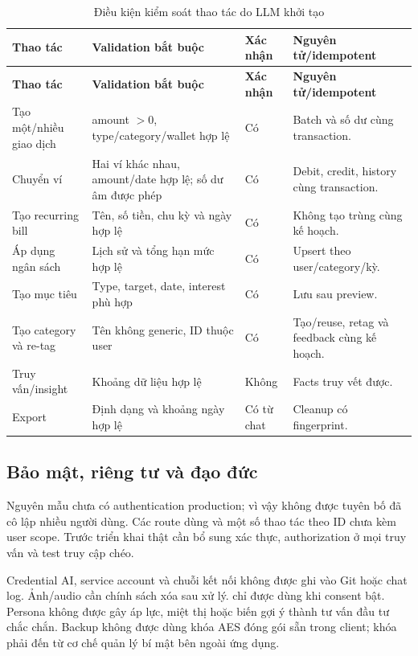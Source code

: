 \begin{longtable}{@{}L{3.0cm}L{5.0cm}L{1.5cm}L{3.2cm}@{}}
  \caption{Điều kiện kiểm soát thao tác do LLM khởi tạo}\label{tab:llm-actions}\\
  \toprule
  \textbf{Thao tác} & \textbf{Validation bắt buộc} & \textbf{Xác nhận} & \textbf{Nguyên tử/idempotent} \\
  \midrule
  \endfirsthead
  \toprule
  \textbf{Thao tác} & \textbf{Validation bắt buộc} & \textbf{Xác nhận} & \textbf{Nguyên tử/idempotent} \\
  \midrule
  \endhead
  Tạo một/nhiều giao dịch & amount $>0$, type/category/wallet hợp lệ & Có & Batch và số dư cùng transaction. \\
  Chuyển ví & Hai ví khác nhau, amount/date hợp lệ; số dư âm được phép & Có & Debit, credit, history cùng transaction. \\
  Tạo recurring bill & Tên, số tiền, chu kỳ và ngày hợp lệ & Có & Không tạo trùng cùng kế hoạch. \\
  Áp dụng ngân sách & Lịch sử và tổng hạn mức hợp lệ & Có & Upsert theo user/category/kỳ. \\
  Tạo mục tiêu & Type, target, date, interest phù hợp & Có & Lưu sau preview. \\
  Tạo category và re-tag & Tên không generic, ID thuộc user & Có & Tạo/reuse, retag và feedback cùng kế hoạch. \\
  Truy vấn/insight & Khoảng dữ liệu hợp lệ & Không & Facts truy vết được. \\
  Export & Định dạng và khoảng ngày hợp lệ & Có từ chat & Cleanup có fingerprint. \\
  \bottomrule
\end{longtable}

\subsection{Bảo mật, riêng tư và đạo đức}

Nguyên mẫu chưa có authentication production; vì vậy không được tuyên bố đã cô lập nhiều người dùng. Các route dùng  và một số thao tác theo ID chưa kèm user scope. Trước triển khai thật cần bổ sung xác thực, authorization ở mọi truy vấn và test truy cập chéo.

Credential AI, service account và chuỗi kết nối không được ghi vào Git hoặc chat log. Ảnh/audio cần chính sách xóa sau xử lý.  chỉ được dùng khi consent bật. Persona không được gây áp lực, miệt thị hoặc biến gợi ý thành tư vấn đầu tư chắc chắn. Backup không được dùng khóa AES đóng gói sẵn trong client; khóa phải đến từ cơ chế quản lý bí mật bên ngoài ứng dụng.

